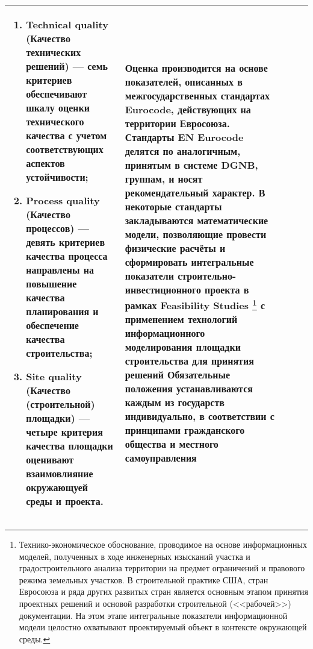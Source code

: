 \begin{landscape}
\begin{center}
\begin{longtable}{|m{40mm}|p{40mm}|p{40mm}|p{55mm}|p{55mm}|}
\begin{enumerate}[1)]
                        \item Technical quality (Качество технических решений) --- семь критериев обеспечивают шкалу оценки технического качества с учетом соответствующих аспектов устойчивости;
                        \item Process quality (Качество процессов) --- девять критериев качества процесса направлены на повышение качества планирования и обеспечение качества строительства;
                        \item Site quality (Качество (строительной) площадки) --- четыре критерия качества площадки оценивают взаимовлияние окружающуей среды и проекта.
                    \end{enumerate} &
                    Оценка производится на основе показателей, описанных в межгосударственных стандартах Eurocode, действующих на территории Евросоюза.
                    Стандарты EN Eurocode делятся по аналогичным, принятым в системе DGNB, группам, и носят рекомендательный характер.
                    В некоторые стандарты закладываются математические модели, позволяющие провести физические расчёты и сформировать интегральные показатели строительно-инвестиционного проекта
                    в рамках Feasibility Studies \footnote{Технико-экономическое обоснование, проводимое на основе информационных моделей, полученных в ходе инженерных изысканий участка и градостроительного анализа территории на предмет ограничений и правового режима земельных участков.
                            В строительной практике США, стран Евросоюза и ряда других развитых стран является основным этапом принятия проектных решений и основой разработки строительной (<<рабочей>>) документации.
                            На этом этапе интегральные показатели информационной модели целостно охватывают проектируемый объект в контексте окружающей среды.}
                    с применением технологий информационного моделирования площадки строительства для принятия решений
                    Обязательные положения устанавливаются каждым из государств индивидуально, в соответствии с принципами гражданского общества и местного самоуправления \\ \hline

            \end{longtable}
        \end{center}
    
\end{landscape}